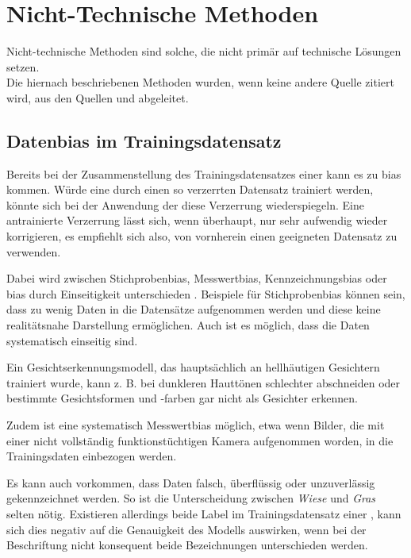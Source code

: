 \documentclass[hidelinks,12pt]{report}
\begin{document}
\section{Nicht-Technische Methoden}
Nicht-technische Methoden sind solche, die nicht primär auf technische Lösungen setzen.\\
Die hiernach beschriebenen Methoden wurden, wenn keine andere Quelle zitiert wird, aus den Quellen \cite{UNESCO} und \cite{EUCommision} abgeleitet. %

\subsection{Daten\gls{bias} im Trainingsdatensatz}
Bereits bei der Zusammenstellung des Trainingsdatensatzes einer  kann es zu \Gls{bias}  kommen. Würde eine  durch einen so verzerrten Datensatz trainiert werden, könnte sich bei der Anwendung der  diese Verzerrung wiederspiegeln. Eine antrainierte Verzerrung lässt sich, wenn überhaupt, nur sehr aufwendig wieder korrigieren, es empfiehlt sich also, von vornherein einen geeigneten Datensatz zu verwenden.

Dabei wird zwischen Stichproben\gls{bias}, Messwert\gls{bias}, Kennzeichnungs\gls{bias} oder \gls{bias} durch Einseitigkeit unterschieden \cite[S. 48ff.]{Srinivasan}.
Beispiele für Stichproben\gls{bias} können sein, dass zu wenig Daten in die Datensätze aufgenommen werden und diese keine realitätsnahe Darstellung ermöglichen.
Auch ist es möglich, dass die Daten systematisch einseitig sind. 

Ein Gesichtserkennungsmodell, das hauptsächlich an hellhäutigen Gesichtern trainiert wurde, kann z. B. bei dunkleren Hauttönen schlechter abschneiden oder bestimmte Gesichtsformen und -farben gar nicht als Gesichter erkennen.

Zudem ist eine systematisch Messwert\gls{bias} möglich, etwa wenn Bilder, die mit einer nicht vollständig funktionstüchtigen Kamera aufgenommen worden, in die Trainingsdaten einbezogen werden.

Es kann auch vorkommen, dass Daten falsch, überflüssig oder unzuverlässig gekennzeichnet werden. So ist die Unterscheidung zwischen \textit{Wiese} und \textit{Gras} selten nötig. Existieren allerdings beide Label im Trainingsdatensatz einer , kann sich dies negativ auf die Genauigkeit des Modells auswirken, wenn bei der Beschriftung nicht konsequent beide Bezeichnungen unterschieden werden\cite[S. 48ff.]{Srinivasan}. 
\end{document}
